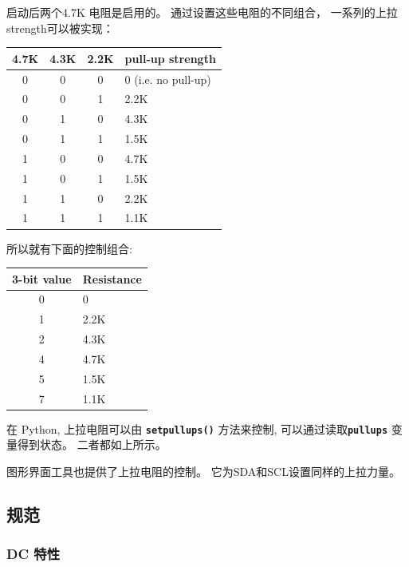 \documentclass{article}
\newcommand{\mach}[1]{\texttt{\textbf{#1}}}
\newcommand{\gap}{\vspace{10pt}}
\begin{document}
启动后两个4.7K 电阻是启用的。 
通过设置这些电阻的不同组合， 一系列的上拉strength可以被实现： 


\begin{center}\begin{tabular}{cccl}
\hline
4.7K & 4.3K & 2.2K & pull-up strength \\
\hline
 0   &  0   &   0  & 0 (i.e. no pull-up) \\
 0   &  0   &   1  & 2.2K \\
 0   &  1   &   0  & 4.3K \\
 0   &  1   &   1  & 1.5K \\
 1   &  0   &   0  & 4.7K \\
 1   &  0   &   1  & 1.5K \\
 1   &  1   &   0  & 2.2K \\
 1   &  1   &   1  & 1.1K \\
\hline
\end{tabular}\end{center}\gap


所以就有下面的控制组合:

\begin{center}\begin{tabular}{cl}
\hline
3-bit value & Resistance \\
\hline
  0         & 0 \\
  1         & 2.2K \\
  2         & 4.3K \\
  4         & 4.7K \\
  5         & 1.5K \\
  7         & 1.1K \\
\hline
\end{tabular}\end{center}\gap

在 Python, 上拉电阻可以由 \mach{setpullups()} 方法来控制, 可以通过读取\mach{pullups} 变量得到状态。 
二者都如上所示。 

图形界面工具也提供了上拉电阻的控制。 它为SDA和SCL设置同样的上拉力量。 


\newpage
\subsection{规范}\label{electrical-characteristics}

\subsubsection{DC 特性}
\vspace{10 pt}
\end{document}
